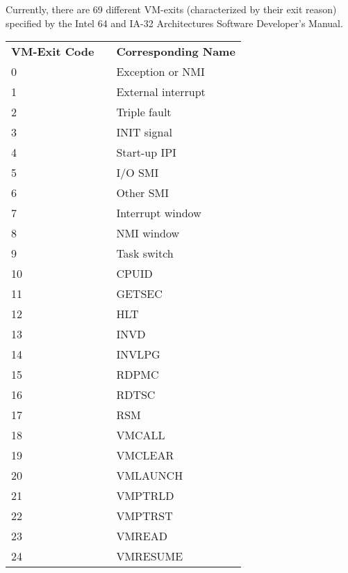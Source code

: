 \documentclass{report}
\begin{document}
\begin{spacing}{1.5}




{\large
Currently, there are 69
different VM-exits (characterized by their exit reason) specified by the Intel 64 and IA-32 Architectures Software Developer’s Manual.
\newline
}


\begin{longtable}{lcl}
\large{\bf VM-Exit Code}  & & \large{\bf Corresponding Name} \\
\large{0}   & &   \large{Exception or NMI} \\
\large{1}   & &   \large{External interrupt} \\
\large{2}   & &   \large{Triple fault} \\
\large{3}   & &   \large{INIT signal} \\
\large{4}   & &   \large{Start-up IPI} \\
\large{5}   & &   \large{I/O SMI} \\
\large{6}   & &   \large{Other SMI} \\
\large{7}   & &   \large{Interrupt window} \\
\large{8}   & &   \large{NMI window} \\
\large{9}   & &   \large{Task switch} \\
\large{10}  & &   \large{CPUID} \\
\large{11}  & &   \large{GETSEC} \\
\large{12}  & &   \large{HLT} \\
\large{13}  & &   \large{INVD} \\
\large{14}  & &   \large{INVLPG} \\
\large{15}  & &   \large{RDPMC} \\
\large{16}  & &   \large{RDTSC} \\
\large{17}  & &   \large{RSM} \\
\large{18}  & &   \large{VMCALL} \\
\large{19}  & &   \large{VMCLEAR} \\
\large{20}  & &   \large{VMLAUNCH} \\
\large{21}  & &   \large{VMPTRLD} \\
\large{22}  & &   \large{VMPTRST} \\
\large{23}  & &   \large{VMREAD} \\
\large{24}  & &   \large{VMRESUME} \\

\end{longtable}
\end{spacing}
\end{document}
